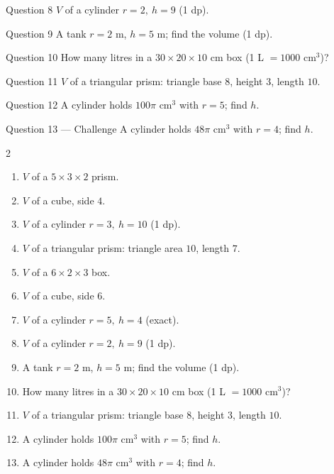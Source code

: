 \documentclass[11pt]{article}
\begin{document}
\begin{qbox}{Question 8}
$V$ of a cylinder $r=2,\ h=9$ (1 dp).\workspace{2.0cm}
\end{qbox}

\begin{qbox}{Question 9}
A tank $r=2$ m, $h=5$ m; find the volume (1 dp).\workspace{2.2cm}
\end{qbox}

\begin{qbox}{Question 10}
How many litres in a $30\times20\times10$ cm box (1 L $=1000$ cm$^3$)?\workspace{2.2cm}
\end{qbox}

\begin{qbox}{Question 11}
$V$ of a triangular prism: triangle base $8$, height $3$, length $10$.\workspace{2.2cm}
\end{qbox}

\begin{qbox}{Question 12}
A cylinder holds $100\pi$ cm$^3$ with $r=5$; find $h$.\workspace{2.2cm}
\end{qbox}

\begin{qbox}{Question 13 --- Challenge}
A cylinder holds $48\pi$ cm$^3$ with $r=4$; find $h$.\workspace{2.4cm}
\end{qbox}

\clearpage
{}

\begin{recapbox}
\begin{multicols}{2}
\small
\begin{enumerate}[leftmargin=*,itemsep=3pt]
  \item $V$ of a $5\times3\times2$ prism.
  \item $V$ of a cube, side $4$.
  \item $V$ of a cylinder $r=3,\ h=10$ (1 dp).
  \item $V$ of a triangular prism: triangle area $10$, length $7$.
  \item $V$ of a $6\times2\times3$ box.
  \item $V$ of a cube, side $6$.
  \item $V$ of a cylinder $r=5,\ h=4$ (exact).
  \item $V$ of a cylinder $r=2,\ h=9$ (1 dp).
  \item A tank $r=2$ m, $h=5$ m; find the volume (1 dp).
  \item How many litres in a $30\times20\times10$ cm box (1 L $=1000$ cm$^3$)?
  \item $V$ of a triangular prism: triangle base $8$, height $3$, length $10$.
  \item A cylinder holds $100\pi$ cm$^3$ with $r=5$; find $h$.
  \item A cylinder holds $48\pi$ cm$^3$ with $r=4$; find $h$.
\end{enumerate}
\end{multicols}
\end{recapbox}
\end{document}
